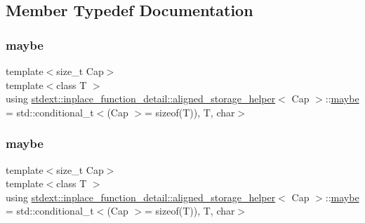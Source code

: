 \subsection{Member Typedef Documentation}
\mbox{\label{unionstdext_1_1inplace__function__detail_1_1aligned__storage__helper_a8265d2d65d57b5e7de088f8b6fc02370}} 
\subsubsection{\texorpdfstring{maybe}{maybe}\hspace{0.1cm}{\footnotesize\ttfamily [1/2]}}
{\footnotesize\ttfamily template$<$size\+\_\+t Cap$>$ \\
template$<$class T $>$ \\
using \hyperlink{unionstdext_1_1inplace__function__detail_1_1aligned__storage__helper}{stdext\+::inplace\+\_\+function\+\_\+detail\+::aligned\+\_\+storage\+\_\+helper}$<$ Cap $>$\+::\hyperlink{unionstdext_1_1inplace__function__detail_1_1aligned__storage__helper_a8265d2d65d57b5e7de088f8b6fc02370}{maybe} =  std\+::conditional\+\_\+t$<$(Cap $>$= sizeof(T)), T, char$>$}

\mbox{\label{unionstdext_1_1inplace__function__detail_1_1aligned__storage__helper_a8265d2d65d57b5e7de088f8b6fc02370}} 
\subsubsection{\texorpdfstring{maybe}{maybe}\hspace{0.1cm}{\footnotesize\ttfamily [2/2]}}
{\footnotesize\ttfamily template$<$size\+\_\+t Cap$>$ \\
template$<$class T $>$ \\
using \hyperlink{unionstdext_1_1inplace__function__detail_1_1aligned__storage__helper}{stdext\+::inplace\+\_\+function\+\_\+detail\+::aligned\+\_\+storage\+\_\+helper}$<$ Cap $>$\+::\hyperlink{unionstdext_1_1inplace__function__detail_1_1aligned__storage__helper_a8265d2d65d57b5e7de088f8b6fc02370}{maybe} =  std\+::conditional\+\_\+t$<$(Cap $>$= sizeof(T)), T, char$>$}




